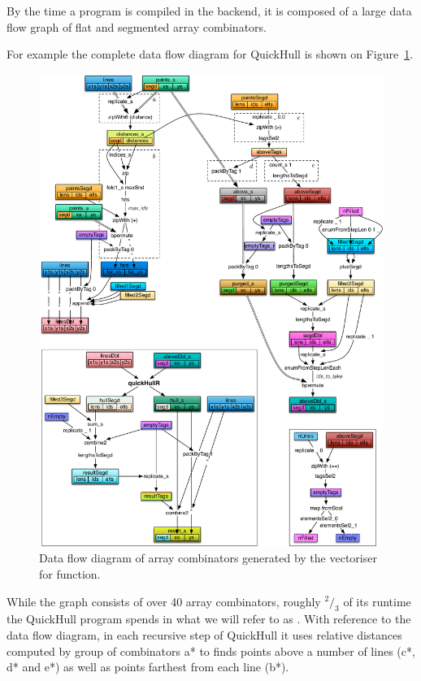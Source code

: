 \documentclass[preamble.tex]{subfiles}
\begin{document}
By the time a \DPH program is compiled in the backend, it is composed of a large data flow graph of flat and segmented array combinators.

For example the complete data flow diagram for QuickHull is shown on Figure~\ref{fig:DFD-QuickHull}.


\begin{figure}
\includegraphics[width=1.1\textwidth, center]{img/DFD-QuickHull}
\caption{Data flow diagram of array combinators generated by the vectoriser for  function.}
\label{fig:DFD-QuickHull}
\end{figure}


While the graph consists of over 40 array combinators, roughly $^2/_3$ of its runtime the QuickHull program spends in what we will refer to as . With reference to the data flow diagram, in each recursive step of QuickHull it uses relative distances computed by group of combinators \*a* to finds points above a number of lines (\*c*, \*d* and \*e*) as well as points farthest from each line (\*b*).
\end{document}
